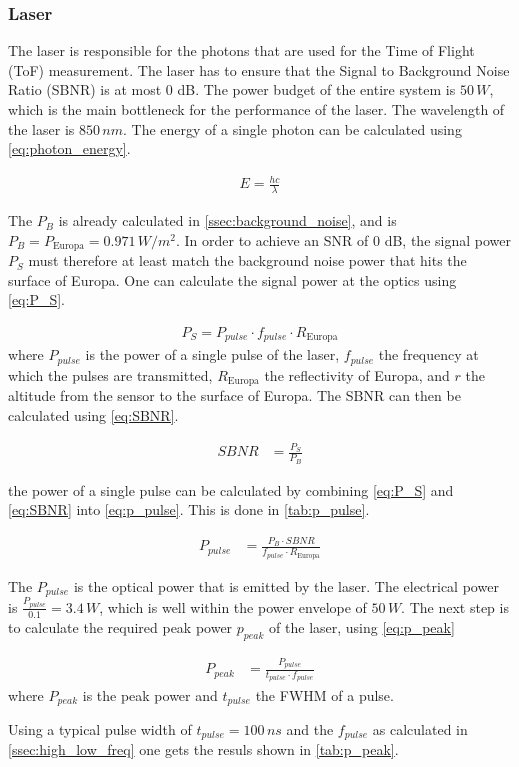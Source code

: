 \subsubsection{Laser}
The laser is responsible for the photons that are used for the Time of Flight (ToF) measurement. The laser has to ensure that the Signal to Background Noise Ratio (SBNR) is at most 0 dB. The power budget of the entire system is $50\,W$, which is the main bottleneck for the performance of the laser. The wavelength of the laser is $850\,nm$. The energy of a single photon can be calculated using \cref{eq:photon_energy}. 


\begin{align}\label{eq:photon_energy}
    E = \frac{hc}{\lambda}
\end{align}

The $P_B$ is already calculated in \cref{ssec:background_noise}, and is $P_B = P_{\text{Europa}} =0.971\,W/m^2$. In order to achieve an SNR of 0 dB, the signal power $P_S$ must therefore at least match the background noise power that hits the surface of Europa. One can calculate the signal power at the optics using \cref{eq:P_S}.

\begin{align}\label{eq:P_S}
	P_S = P_{pulse} \cdot f_{pulse} \cdot R_{\text{Europa}}
\end{align}
where $P_{pulse}$ is the power of a single pulse of the laser, $f_{pulse}$ the frequency at which the pulses are transmitted, $R_{\text{Europa}}$ the reflectivity of Europa, and $r$ the altitude from the sensor to the surface of Europa. The SBNR can then be calculated using \cref{eq:SBNR}.

\begin{align}\label{eq:SBNR}
	SBNR &= \frac{P_S}{P_B}
\end{align}

the power of a single pulse can be calculated by combining \cref{eq:P_S} and \cref{eq:SBNR} into \cref{eq:p_pulse}. This is done in \cref{tab:p_pulse}.

\begin{align}
	P_{pulse} &= \frac{P_B\cdot SBNR}{f_{pulse}\cdot R_{\text{Europa}}}
\end{align}



The $P_{pulse}$ is the optical power that is emitted by the laser. The electrical power is $\frac{P_{pulse}}{0.1}=3.4\,W$, which is well within the power envelope of $50\,W$. The next step is to calculate the required peak power $p_{peak}$ of the laser, using \cref{eq:p_peak}

\begin{align}\label{eq:p_peak}
 	P_{peak} &= \frac{P_{pulse}}{t_{pulse} \cdot f_{pulse}}
 \end{align} 
where $P_{peak}$ is the peak power and $t_{pulse}$ the FWHM of a pulse.

Using a typical pulse width of $t_{pulse} = 100\,ns$ and the $f_{pulse}$ as calculated in \cref{ssec:high_low_freq} one gets the resuls shown in \cref{tab:p_peak}.



